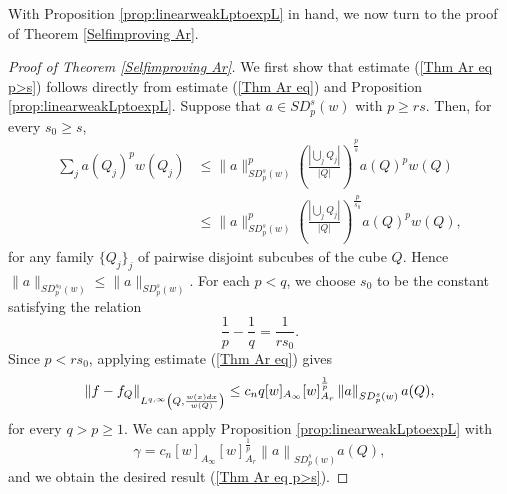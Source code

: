 \documentclass[reqno, 10pt, oneside]{amsart}
\numberwithin{equation}{section}
\newcommand{\strt}[1]{\rule{0pt}{#1}}
\numberwithin{theorem}{section}
\newcommand{\norm}[1]{\left\|#1\right\|}
\newcommand{\1}{{\rm 1\hspace*{-0.4ex}%
\rule{0.1ex}{1.52ex}\hspace*{0.2ex}}}
\begin{document}
With Proposition \ref{prop:linearweakLptoexpL} in hand, we now turn to the proof of Theorem \ref{Selfimproving Ar}.


\begin{proof}[Proof of Theorem \ref{Selfimproving Ar}]
We first show that estimate (\ref{Thm Ar eq p>s}) follows directly from estimate (\ref{Thm Ar eq}) and Proposition \ref{prop:linearweakLptoexpL}. Suppose that $a\in SD_p^s(w)$ with $p \ge rs$. Then, for every $s_0 \ge s$,  
\begin{align}
 \sum\limits_{j}a(Q_j)^pw(Q_j) & \le \|a\|_{SD_{p}^{s}(w)}^p
\left(\frac{\left| \bigcup_j Q_j \right| }{|Q|}  \right)^{\frac{p}{s}}a(Q)^{p}w(Q) \nonumber \\
& \le \|a\|_{SD_{p}^{s}(w)}^p\left( \frac{\left| \bigcup_j Q_j \right| }{|Q|}\right)^{\frac{p}{s_0}}a(Q)^{p}w(Q), \nonumber 
\end{align}
%
for any family $\{Q_j\}_j$ of pairwise disjoint subcubes of the cube $Q$. Hence $\|a\|_{SD_{p}^{s_0}(w)} \le \|a\|_{SD_{p}^{s}(w)}$. For each $p < q$, we choose $s_0$ to be the constant satisfying the relation 
$$\frac{1}{p}-\frac{1}{q}=\frac{1}{r{s}_0}.$$ 
Since $p < rs_0$, applying estimate (\ref{Thm Ar eq}) gives 
\begin{equation*}
    \norm{f-f_Q}_{\strt{2.3ex} L^{q,\infty}\left(Q, \frac{w(x)dx}{w(Q)}\right)} \le c_n q  [w]_{A_\infty} [w]_{A_r}^{\frac{1}{p}}\left\| a\right\|_{SD_p^s(w)} a(Q),
\end{equation*}
for every $q > p \ge 1$.  We can apply Proposition \ref{prop:linearweakLptoexpL} with 
\begin{equation*}
    \gamma = c_{n}   [w]_{A_\infty} [w]_{A_r}^{\frac{1}{p}}\left\| a\right\|_{SD_p^s(w)} a(Q), 
\end{equation*}
and we obtain the desired result (\ref{Thm Ar eq p>s}).


\end{proof}
\end{document}
